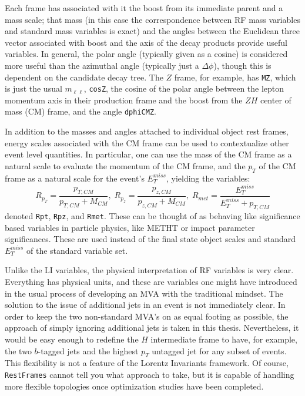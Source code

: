 Each frame has associated with it the boost from its immediate parent and a mass scale; that mass (in this case the correspondence between RF mass variables and standard mass variables is exact) and the angles between the Euclidean three vector associated with boost and the axis of the decay products provide useful variables.  In general, the polar angle (typically given as a cosine) is considered more useful than the azimuthal angle (typically just a $\Delta\phi$), though this is dependent on the candidate decay tree.  The $Z$ frame, for example, has \texttt{MZ}, which is just the usual $m_{\ell\ell}$, \texttt{cosZ}, the cosine of the polar angle between the lepton momentum axis in their production frame and the boost from the $ZH$ center of mass (CM) frame, and the angle \texttt{dphiCMZ}.

In addition to the masses and angles attached to individual object rest frames, energy scales associated with the CM frame can be used to contextualize other event level quantities.  In particular, one can use the mass of the CM frame as a natural scale to evaluate the momentum of the CM frame, and the $p_T$ of the CM frame as a natural scale for the event's $E_T^{miss}$, yielding the variables:
\begin{equation}
\label{eqn:Rrjr}
R_{p_T} = \frac{p_{T,CM}}{p_{T,CM}+M_{CM}},\;R_{p_z} = \frac{p_{z,CM}}{p_{z,CM}+M_{CM}},\;R_{met} = \frac{E_T^{miss}}{E_T^{miss}+p_{T,CM}}
\end{equation}
denoted \texttt{Rpt}, \texttt{Rpz}, and \texttt{Rmet}.  These can be thought of as behaving like significance based variables in particle physics, like METHT or impact parameter significances.  These are used instead of the final state object scales and standard $E_T^{miss}$ of the standard variable set.

Unlike the LI variables, the physical interpretation of RF variables is very clear.  Everything has physical units, and these are variables one might have introduced in the usual process of developing an MVA with the traditional mindset.  The solution to the issue of additional jets in an event is not immediately clear.  In order to keep the two non-standard MVA's on as equal footing as possible, the approach of simply ignoring additional jets is taken in this thesis.  Nevertheless, it would be easy enough to redefine the $H$ intermediate frame to have, for example, the two $b$-tagged jets and the highest $p_T$ untagged jet for any subset of events.  This flexibility is not a feature of the Lorentz Invariants framework.  Of course, \texttt{RestFrames} cannot tell you what approach to take, but it is capable of handling more flexible topologies once optimization studies have been completed.

